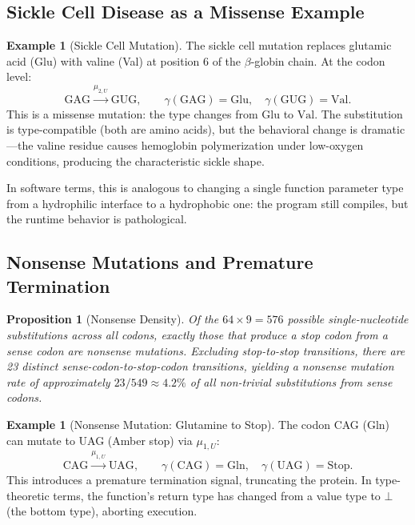 \documentclass[12pt,a4paper]{article}
\newtheorem{proposition}[theorem]{Proposition}
\theoremstyle{definition}
\newtheorem{example}[theorem]{Example}
\begin{document}
\subsection{Sickle Cell Disease as a Missense Example}

\begin{example}[Sickle Cell Mutation]\label{ex:sickle-cell}
The sickle cell mutation replaces glutamic acid (Glu) with valine (Val) at position 6 of the $\beta$-globin chain. At the codon level:
\[
  \text{GAG} \xrightarrow{\mu_{2,U}} \text{GUG}, \qquad \gamma(\text{GAG}) = \text{Glu}, \quad \gamma(\text{GUG}) = \text{Val}.
\]
This is a missense mutation: the type changes from $\text{Glu}$ to $\text{Val}$. The substitution is type-compatible (both are amino acids), but the behavioral change is dramatic---the valine residue causes hemoglobin polymerization under low-oxygen conditions, producing the characteristic sickle shape.

In software terms, this is analogous to changing a single function parameter type from a hydrophilic interface to a hydrophobic one: the program still compiles, but the runtime behavior is pathological.
\end{example}

\subsection{Nonsense Mutations and Premature Termination}

\begin{proposition}[Nonsense Density]\label{prop:nonsense-density}
Of the $64 \times 9 = 576$ possible single-nucleotide substitutions across all codons, exactly those that produce a stop codon from a sense codon are nonsense mutations. Excluding stop-to-stop transitions, there are 23 distinct sense-codon-to-stop-codon transitions, yielding a nonsense mutation rate of approximately $23/549 \approx 4.2\%$ of all non-trivial substitutions from sense codons.
\end{proposition}

\begin{example}[Nonsense Mutation: Glutamine to Stop]\label{ex:nonsense}
The codon CAG (Gln) can mutate to UAG (Amber stop) via $\mu_{1,U}$:
\[
  \text{CAG} \xrightarrow{\mu_{1,U}} \text{UAG}, \qquad \gamma(\text{CAG}) = \text{Gln}, \quad \gamma(\text{UAG}) = \text{Stop}.
\]
This introduces a premature termination signal, truncating the protein. In type-theoretic terms, the function's return type has changed from a value type to $\bot$ (the bottom type), aborting execution.
\end{example}
\end{document}
